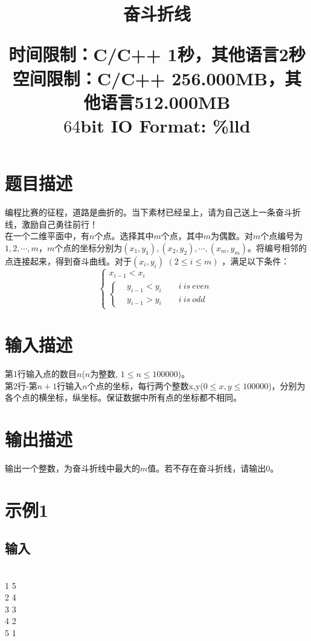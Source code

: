 \documentclass{article}
\date{}
\title{奋斗折线 \\ [2ex] \begin{large} 
	时间限制：C/C++ 1秒，其他语言2秒 \\
	空间限制：C/C++ 256.000MB，其他语言512.000MB 	\\
	$64$bit IO Format: \%lld
 			\end{large} }
\begin{document}
		\maketitle \vspace{-50pt}
		
		\section*{题目描述}
		\indent 编程比赛的征程，道路是曲折的。当下素材已经呈上，请为自己送上一条奋斗折线，激励自己勇往前行！\\
		\indent 在一个二维平面中，有$n$个点。选择其中$m$个点，其中$m$为偶数。对$m$个点编号为$1,2,\cdots,m$，$m$个点的坐标分别为$ (x_{1},y_{1}) , (x_{2},y_{2}) , \cdots , (x_{m},y_{m}) $。将编号相邻的点连接起来，得到奋斗曲线。对于$(x_{i}, y_{i})$ $(2 \le i \le m)$ ，满足以下条件：\\
\begin{equation}\nonumber
	\left\{
	\begin{aligned}
		x_{i-1}<x_{i} \\
		\left\{
		\begin{aligned}
			&y_{i-1}<y_{i} \qquad i \ is \ even \\
			&y_{i-1}>y_{i} \qquad i \ is \ odd
		\end{aligned}
		\right.
	\end{aligned}
	\right.
\end{equation}

		\section*{输入描述}
			\noindent 第1行输入点的数目$n$($n$为整数, $1 \le n \le 100000$)。\\
			第2行-第$n+1$行输入$n$个点的坐标，每行两个整数x,y($0 \le x,y \le 100000$)，分别为各个点的横坐标，纵坐标。保证数据中所有点的坐标都不相同。

		\section*{输出描述}
			\noindent 输出一个整数，为奋斗折线中最大的$m$值。若不存在奋斗折线，请输出$0$。
			
		\section*{示例1}
			\subsection*{输入}
		\\
1 5	\\
2 4	\\
3 3	\\
4 2	\\
5 1
\end{document}
